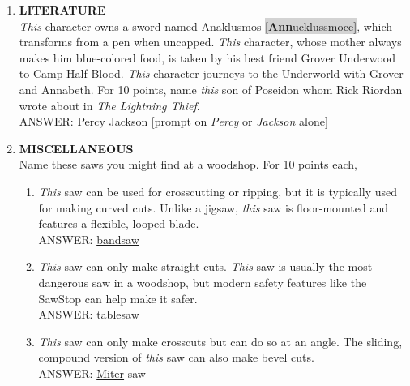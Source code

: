 \documentclass{report}
\newcommand*{\backtrack}{\setcounter{enumi}{\numexpr\theenumi-1\relax}}
\begin{document}
\begin{enumerate}
    \item \textbf{LITERATURE} \\ \textit{This} character owns a sword named Anaklusmos \colorbox{lightGray}{[\textbf{Ann}\textperiodcentered uck\textperiodcentered luss\textperiodcentered moce]}, which transforms from a pen when uncapped. \textit{This} character, whose mother always makes him blue-colored food, is taken by his best friend Grover Underwood to Camp Half-Blood. \textit{This} character journeys to the Underworld with Grover and Annabeth. For 10 points, name \textit{this} son of Poseidon whom Rick Riordan wrote about in \textit{The Lightning Thief}. \\ ANSWER: \underline{Percy Jackson} [prompt on \textit{Percy} or \textit{Jackson} alone] \backtrack
    \item \textbf{MISCELLANEOUS} \\ Name these saws you might find at a woodshop. For 10 points each,
    \begin{enumerate}[label=\Alph*]
        \item \textit{This} saw can be used for crosscutting or ripping, but it is typically used for making curved cuts. Unlike a jigsaw, \textit{this} saw is floor-mounted and features a flexible, looped blade. \\ ANSWER: \underline{bandsaw}
        \item \textit{This} saw can only make straight cuts. \textit{This} saw is usually the most dangerous saw in a woodshop, but modern safety features like the SawStop can help make it safer. \\ ANSWER: \underline{tablesaw}
        \item \textit{This} saw can only make crosscuts but can do so at an angle. The sliding, compound version of \textit{this} saw can also make bevel cuts. \\ ANSWER: \underline{Miter} saw
    \end{enumerate}


\end{enumerate}
\end{document}
